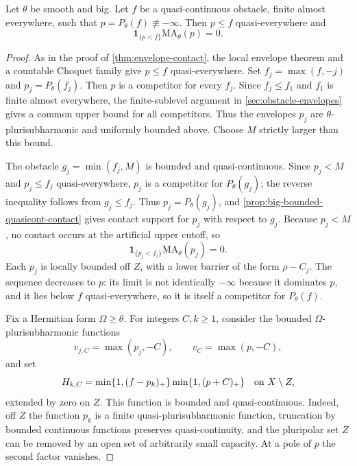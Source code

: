 \begin{theorem}
\label{thm:big-general-envelope-contact}
Let $\theta$ be smooth and big. Let $f$ be a quasi-continuous obstacle, finite almost everywhere, such that $p=P_\theta(f)\not\equiv-\infty$. Then $p\leq f$ quasi-everywhere and
\[
 \mathbf1_{\{p<f\}}\mathrm{MA}_\theta(p)=0.
\]
\end{theorem}
\begin{proof}
As in the proof of \cref{thm:envelope-contact}, the local envelope theorem and a countable Choquet family give $p\leq f$ quasi-everywhere. Set $f_j=\max(f,-j)$ and $p_j=P_\theta(f_j)$. Then $p$ is a competitor for every $f_j$. Since $f_j\leq f_1$ and $f_1$ is finite almost everywhere, the finite-sublevel argument in \cref{sec:obstacle-envelopes} gives a common upper bound for all competitors. Thus the envelopes $p_j$ are $\theta$-plurisubharmonic and uniformly bounded above. Choose $M$ strictly larger than this bound.

The obstacle $g_j=\min(f_j,M)$ is bounded and quasi-continuous. Since $p_j<M$ and $p_j\leq f_j$ quasi-everywhere, $p_j$ is a competitor for $P_\theta(g_j)$; the reverse inequality follows from $g_j\leq f_j$. Thus $p_j=P_\theta(g_j)$, and \cref{prop:big-bounded-quasicont-contact} gives contact support for $p_j$ with respect to $g_j$. Because $p_j<M$, no contact occurs at the artificial upper cutoff, so
\begin{equation}\label{eq:big-truncated-obstacle-contact}
 \mathbf1_{\{p_j<f_j\}}\mathrm{MA}_\theta(p_j)=0.
\end{equation}
Each $p_j$ is locally bounded off $Z$, with a lower barrier of the form $\rho-C_j$. The sequence decreases to $p$: its limit is not identically $-\infty$ because it dominates $p$, and it lies below $f$ quasi-everywhere, so it is itself a competitor for $P_\theta(f)$.

Fix a Hermitian form $\Omega\geq\theta$. For integers $C,k\geq1$, consider the bounded $\Omega$-plurisubharmonic functions
\[
 v_{j,C}=\max(p_j,-C),\qquad v_C=\max(p,-C),
\]
and set
\[
 H_{k,C}
  =\min\{1,(f-p_k)_+\}\min\{1,(p+C)_+\}
       \quad\hbox{on }X\setminus Z,
\]
extended by zero on $Z$. This function is bounded and quasi-continuous. Indeed, off $Z$ the function $p_k$ is a finite quasi-plurisubharmonic function, truncation by bounded continuous functions preserves quasi-continuity, and the pluripolar set $Z$ can be removed by an open set of arbitrarily small capacity. At a pole of $p$ the second factor vanishes.


\end{proof}
